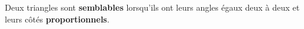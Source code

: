 \documentclass[main.tex]{subfiles}
\begin{document}




\begin{definition} Deux triangles sont \textbf{semblables}   lorsqu'ils ont leurs angles égaux deux à deux et leurs côtés \textbf{proportionnels}. 
\end{definition}
\end{document}
